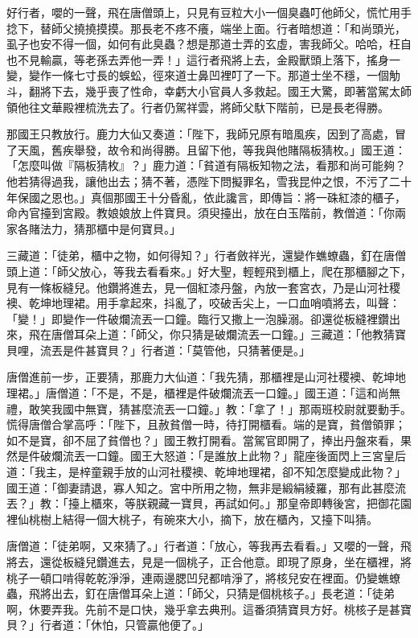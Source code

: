 好行者，嚶的一聲，飛在唐僧頭上，只見有豆粒大小一個臭蟲叮他師父，慌忙用手捻下，替師父撓撓摸摸。那長老不疼不癢，端坐上面。行者暗想道：「和尚頭光，虱子也安不得一個，如何有此臭蟲？想是那道士弄的玄虛，害我師父。哈哈，枉自也不見輸贏，等老孫去弄他一弄！」這行者飛將上去，金殿獸頭上落下，搖身一變，變作一條七寸長的蜈蚣，徑來道士鼻凹裡叮了一下。那道士坐不穩，一個觔斗，翻將下去，幾乎喪了性命，幸虧大小官員人多救起。國王大驚，即著當駕太師領他往文華殿裡梳洗去了。行者仍駕祥雲，將師父馱下階前，已是長老得勝。

那國王只教放行。鹿力大仙又奏道：「陛下，我師兄原有暗風疾，因到了高處，冒了天風，舊疾舉發，故令和尚得勝。且留下他，等我與他賭隔板猜枚。」國王道：「怎麼叫做『隔板猜枚』？」鹿力道：「貧道有隔板知物之法，看那和尚可能夠？他若猜得過我，讓他出去；猜不著，憑陛下問擬罪名，雪我昆仲之恨，不污了二十年保國之恩也。」真個那國王十分昏亂，依此讒言，即傳旨：將一硃紅漆的櫃子，命內官擡到宮殿。教娘娘放上件寶貝。須臾擡出，放在白玉階前，教僧道：「你兩家各賭法力，猜那櫃中是何寶貝。」

三藏道：「徒弟，櫃中之物，如何得知？」行者斂祥光，還變作蟭蟟蟲，釘在唐僧頭上道：「師父放心，等我去看看來。」好大聖，輕輕飛到櫃上，爬在那櫃腳之下，見有一條板縫兒。他鑽將進去，見一個紅漆丹盤，內放一套宮衣，乃是山河社稷襖、乾坤地理裙。用手拿起來，抖亂了，咬破舌尖上，一口血哨噴將去，叫聲：「變！」即變作一件破爛流丟一口鐘。臨行又撒上一泡臊溺。卻還從板縫裡鑽出來，飛在唐僧耳朵上道：「師父，你只猜是破爛流丟一口鐘。」三藏道：「他教猜寶貝哩，流丟是件甚寶貝？」行者道：「莫管他，只猜著便是。」

唐僧進前一步，正要猜，那鹿力大仙道：「我先猜，那櫃裡是山河社稷襖、乾坤地理裙。」唐僧道：「不是，不是，櫃裡是件破爛流丟一口鐘。」國王道：「這和尚無禮，敢笑我國中無寶，猜甚麼流丟一口鐘。」教：「拿了！」那兩班校尉就要動手。慌得唐僧合掌高呼：「陛下，且赦貧僧一時，待打開櫃看。端的是寶，貧僧領罪；如不是寶，卻不屈了貧僧也？」國王教打開看。當駕官即開了，捧出丹盤來看，果然是件破爛流丟一口鐘。國王大怒道：「是誰放上此物？」龍座後面閃上三宮皇后道：「我主，是梓童親手放的山河社稷襖、乾坤地理裙，卻不知怎麼變成此物？」國王道：「御妻請退，寡人知之。宮中所用之物，無非是緞絹綾羅，那有此甚麼流丟？」教：「擡上櫃來，等朕親藏一寶貝，再試如何。」那皇帝即轉後宮，把御花園裡仙桃樹上結得一個大桃子，有碗來大小，摘下，放在櫃內，又擡下叫猜。

唐僧道：「徒弟啊，又來猜了。」行者道：「放心，等我再去看看。」又嚶的一聲，飛將去，還從板縫兒鑽進去，見是一個桃子，正合他意。即現了原身，坐在櫃裡，將桃子一頓口啃得乾乾淨淨，連兩邊腮凹兒都啃淨了，將核兒安在裡面。仍變蟭蟟蟲，飛將出去，釘在唐僧耳朵上道：「師父，只猜是個桃核子。」長老道：「徒弟啊，休要弄我。先前不是口快，幾乎拿去典刑。這番須猜寶貝方好。桃核子是甚寶貝？」行者道：「休怕，只管贏他便了。」

